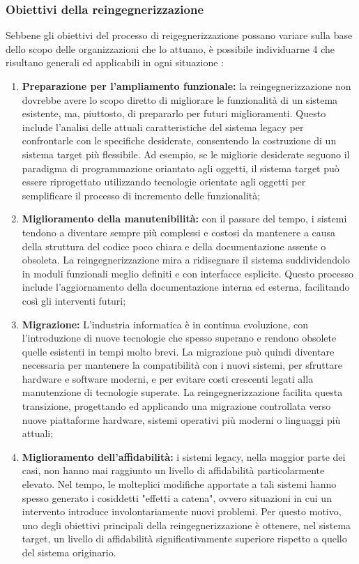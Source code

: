 \subsubsection{Obiettivi della reingegnerizzazione}
Sebbene gli obiettivi del processo di reigegnerizzazione possano variare sulla base dello scopo delle organizzazioni che lo attuano, è possibile individuarne 4 che risultano generali ed applicabili in ogni situazione \cite{rosenberg1996software}:
\begin{enumerate}
  \item \textbf{Preparazione per l'ampliamento funzionale:} la reingegnerizzazione non dovrebbe avere lo scopo diretto di migliorare le funzionalità di un sistema esistente, ma, piuttosto, di prepararlo per futuri miglioramenti. Questo include l'analisi delle attuali caratteristiche del sistema legacy per confrontarle con le specifiche desiderate, consentendo la costruzione di un sistema target più flessibile. Ad esempio, se le migliorie desiderate seguono il paradigma di programmazione oriantato agli oggetti, il sistema target può essere riprogettato utilizzando tecnologie orientate agli oggetti per semplificare il processo di incremento delle funzionalità;

  \item \textbf{Miglioramento della manutenibilità:} con il passare del tempo, i sistemi tendono a diventare sempre più complessi e costosi da mantenere a causa della struttura del codice poco chiara e della documentazione assente o obsoleta. La reingegnerizzazione mira a ridisegnare il sistema suddividendolo in moduli funzionali meglio definiti e con interfacce esplicite. Questo processo include l'aggiornamento della documentazione interna ed esterna, facilitando così gli interventi futuri;

  \item \textbf{Migrazione:} L'industria informatica è in continua evoluzione, con l'introduzione di nuove tecnologie che spesso superano e rendono obsolete quelle esistenti in tempi molto brevi. La migrazione può quindi diventare necessaria per mantenere la compatibilità con i nuovi sistemi, per sfruttare hardware e software moderni, e per evitare costi crescenti legati alla manutenzione di tecnologie superate. La reingegnerizzazione facilita questa transizione, progettando ed applicando una migrazione controllata verso nuove piattaforme hardware, sistemi operativi più moderni o linguaggi più attuali;

  \item \textbf{Miglioramento dell'affidabilità:} i sistemi legacy, nella maggior parte dei casi, non hanno mai raggiunto un livello di affidabilità particolarmente elevato. Nel tempo, le molteplici modifiche apportate a tali sistemi hanno spesso generato i cosiddetti "effetti a catena", ovvero situazioni in cui un intervento introduce involontariamente nuovi problemi. Per questo motivo, uno degli obiettivi principali della reingegnerizzazione è ottenere, nel sistema target, un livello di affidabilità significativamente superiore rispetto a quello del sistema originario.
\end{enumerate}

